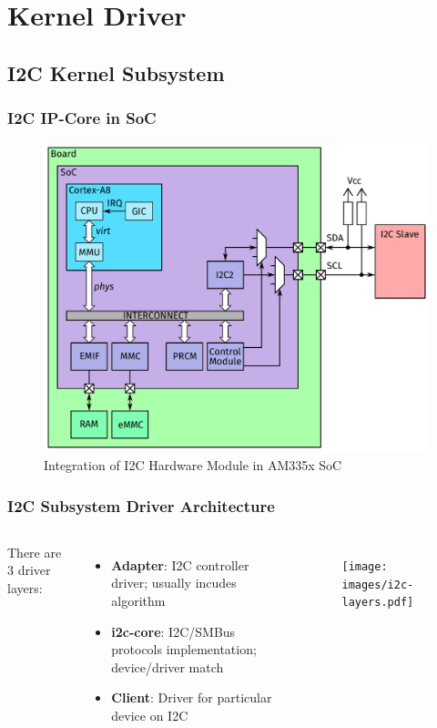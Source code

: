 \documentclass[aspectratio=169,usenames,dvipsnames]{beamer}
\newcounter{cont}
\begin{document}

\section{Kernel Driver}

\subsection{I2C Kernel Subsystem}

\begin{frame}
  \frametitle{I2C IP-Core in SoC}
  \begin{figure}
    \centering
    \vspace*{-3mm}
    \includegraphics[scale=0.2]{images/architecture-i2c.pdf}
    \vspace*{-3mm}
    \caption{Integration of I2C Hardware Module in AM335x SoC}
  \end{figure}
  \vspace*{-12mm}
\end{frame}

\begin{frame}
  \frametitle{I2C Subsystem Driver Architecture}
  \begin{columns}
      There are 3 driver layers:
      \begin{itemize}
        \item \textbf{Adapter}: I2C controller driver; usually incudes algorithm
        \item \textbf{i2c-core}: I2C/SMBus protocols implementation;
              device/driver match
        \item \textbf{Client}: Driver for particular device on I2C
      \end{itemize}
      \vspace*{-3mm}
      \begin{figure}
        \centering
        \texttt{[image: images/i2c-layers.pdf]}
      \end{figure}
      \vspace*{-9mm}
  \end{columns}
\end{frame}
\end{document}
